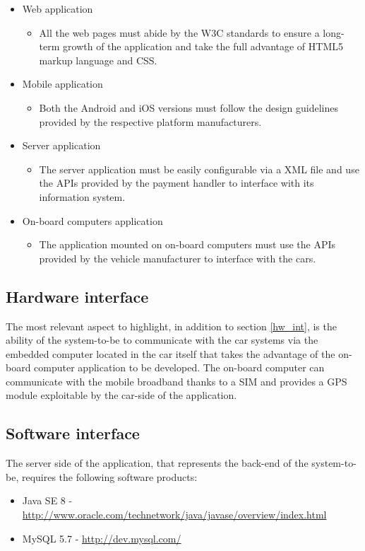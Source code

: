 \begin{itemize}
\item Web application
	\begin{itemize}
	\item[] All the web pages must abide by the W3C standards to ensure a long-term growth of the application and take the full advantage of HTML5 markup language and CSS.
	\end{itemize}
\item Mobile application
	\begin{itemize}
	\item[] Both the Android and iOS versions must follow the design guidelines provided by the respective platform manufacturers.
	\end{itemize}
\item Server application
	\begin{itemize}
	\item[] The server application must be easily configurable via a XML file and use the APIs provided by the payment handler to interface with its information system.
	\end{itemize}
\item On-board computers application
	\begin{itemize}
	\item[] The application mounted on on-board computers must use the APIs provided by the vehicle manufacturer to interface with the cars.
	\end{itemize}
\end{itemize}

\subsection{Hardware interface}
The most relevant aspect to highlight, in addition to section \ref{hw_int}, is the ability of the system-to-be to communicate with the car systems via the embedded computer located in the car itself that takes the advantage of the on-board computer application to be developed. The on-board computer can communicate with the mobile broadband thanks to a SIM and provides a GPS module exploitable by the car-side of the application.

\subsection{Software interface}
The server side of the application, that represents the back-end of the system-to-be, requires the following software products:
\begin{itemize}
\item Java SE 8 - \url{http://www.oracle.com/technetwork/java/javase/overview/index.html}
\item MySQL 5.7 - \url{http://dev.mysql.com/}
\end{itemize}

